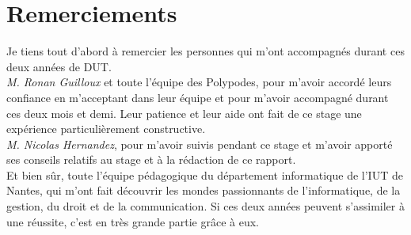 \section*{Remerciements}

Je tiens tout d'abord à remercier les personnes qui m'ont accompagnés durant ces deux années de DUT.\\

\textit{M. Ronan Guilloux} et toute l'équipe des Polypodes, pour m'avoir accordé leurs confiance en m'acceptant dans leur équipe et pour m'avoir accompagné durant ces deux mois et demi. Leur patience et leur aide ont fait de ce stage une expérience particulièrement constructive.\\

\textit{M. Nicolas Hernandez}, pour m'avoir suivis pendant ce stage et m'avoir apporté ses conseils relatifs au stage et à la rédaction de ce rapport.\\

Et bien sûr, toute l'équipe pédagogique du département informatique de l'IUT de Nantes, qui m'ont fait découvrir les mondes passionnants de l'informatique, de la gestion, du droit et de la communication. Si ces deux années peuvent s'assimiler à une réussite, c'est en très grande partie grâce à eux.\\

